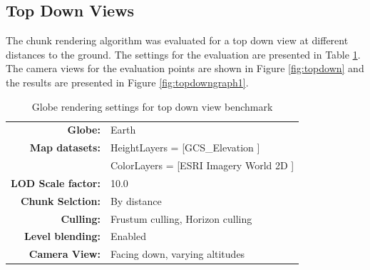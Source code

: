 \clearpage
\subsection{Top Down Views}
\FloatBarrier
The chunk rendering algorithm was evaluated for a top down view at different distances to the ground. The settings for the evaluation are presented in Table \ref{table:settingstopdown}. The camera views for the evaluation points are shown in Figure \ref{fig:topdown} and the results are presented in Figure \ref{fig:topdowngraph1}.
\begin{table}[h]
  \centering
  \caption[]{Globe rendering settings for top down view benchmark}
    \label{table:settingstopdown}
  \begin{tabular}{| r l |}
    \hline
      \textbf{Globe:}             & Earth \\
      \textbf{Map datasets:}      & HeightLayers = [GCS\_Elevation \cite{worldelevation3d}] \\
                                  & ColorLayers = [ESRI Imagery World 2D \cite{imageryworld2d}] \\
      \textbf{LOD Scale factor:}  & 10.0 \\
      \textbf{Chunk Selction:}    & By distance \\
      \textbf{Culling:}           & Frustum culling, Horizon culling \\
      \textbf{Level blending:}    & Enabled \\
      \textbf{Camera View:}       & Facing down, varying altitudes\\
    \hline
  \end{tabular}
\end{table}

